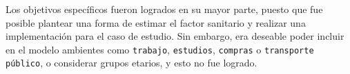 
Los objetivos específicos fueron logrados en su mayor parte, puesto que fue posible plantear una forma de estimar el factor sanitario y realizar una implementación para el caso de estudio. Sin embargo, era deseable poder incluir en el modelo ambientes como \texttt{trabajo}, \texttt{estudios}, \texttt{compras} o \texttt{transporte público}, o considerar grupos etarios, y esto no fue logrado.